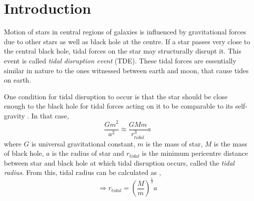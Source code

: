 \documentclass{tda}
\begin{document}

\section{Introduction}

Motion of stars in central regions of galaxies is influenced by gravitational forces due to other stars as well as black hole at the centre. If a star passes very close to the central black hole, tidal forces on the star may structurally disrupt it. This event is called \emph{tidal disruption event} (TDE). These tidal forces are essentially similar in nature to the ones witnessed between earth and moon, that cause tides on earth. 

One condition for tidal disruption to occur is that the star should be close enough to the black hole for tidal forces acting on it to be comparable to its self-gravity \cite{hills_possible_1975}. In that case, 
\[\frac{G m^2}{a^2} \approx \frac{G M m}{r_{tidal}^3} a\]
where \(G\) is universal gravitational constant, \(m\) is the mass of star, \(M\) is the mass of black hole, \(a\) is the radius of star and \(r_{tidal}\) is the minimum pericentre distance between star and black hole at which tidal disruption occurs, called the \emph{tidal radius}. From this, tidal radius can be calculated as \cite{rees_tidal_1988}, 
\begin{equation}
	\Rightarrow r_{tidal} = \left( \frac{M}{m} \right) ^{\frac{1}{3}} a
	\label{eq:tidal_radius}
\end{equation}
\end{document}
